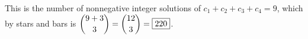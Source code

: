 This is the number of nonnegative integer solutions of $c_1+c_2+c_3+c_4=9$, which by stars and bars is $\dbinom{9+3}3=\dbinom{12}3=\boxed{220}$.

